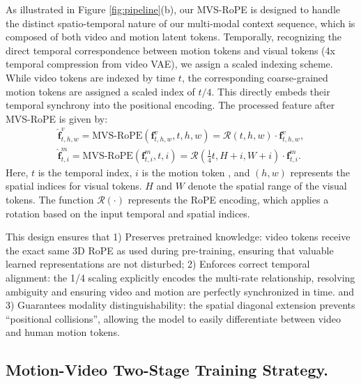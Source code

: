 As illustrated in Figure \ref{fig:pipeline}(b), our MVS-RoPE is designed to handle the distinct spatio-temporal nature of our multi-modal context sequence, which is composed of both video and motion latent tokens. 
Temporally, recognizing the direct temporal correspondence between motion tokens and visual tokens (4x temporal compression from video VAE), we assign a scaled indexing scheme. While video tokens are indexed by time $t$, the corresponding coarse-grained motion tokens are assigned a scaled index of $t/4$. This directly embeds their temporal synchrony into the positional encoding. The processed feature after MVS-RoPE is given by:
\begin{align}
\hat{\bm{f}}_{t,h,w}^{v}= \text{MVS-RoPE}(\bm{f}_{t,h,w}^{v},t,h,w)=\mathcal{R}(t, h, w)\cdot \bm{f}_{t,h,w}^{v},\\
\hat{\bm{f}}_{t,i}^{m}=\text{MVS-RoPE}(\bm{f}_{t,i}^{m},t,i)=\mathcal{R}(\frac{1}{4}t, H+i, W+i)\cdot \bm{f}_{t,i}^{m}.
\end{align}
Here, $t$ is the temporal index, $i$ is the motion token , and $(h,w)$  represents the spatial indices for visual tokens. $H$ and $W$ denote the spatial range of the visual tokens.  The function $\mathcal{R}(\cdot)$ represents the RoPE encoding, which applies a rotation based on the input temporal and spatial indices. 

This design ensures that 1) Preserves pretrained knowledge: video tokens receive the exact same 3D RoPE as used during pre-training, ensuring that valuable learned representations are not disturbed; 2) Enforces correct temporal alignment: the 1/4 scaling explicitly encodes the multi-rate relationship, resolving ambiguity and ensuring video and motion are perfectly synchronized in time. and 3) Guarantees modality distinguishability: the spatial diagonal extension prevents “positional collisions”, allowing the model to easily differentiate between video and human motion tokens.



\subsection{Motion-Video Two-Stage Training Strategy.}\label{in-context-learning}

